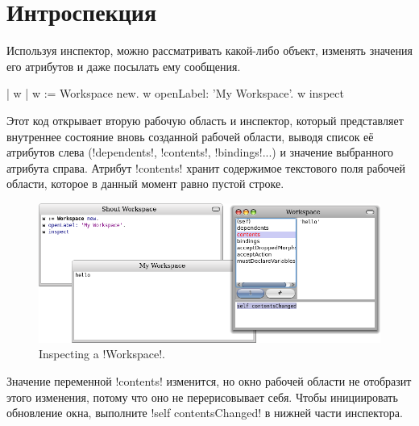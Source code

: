 \documentclass[a4paper,10pt,twoside]{book}
\begin{document}
\section{Интроспекция}

Используя инспектор, можно рассматривать какой-либо объект, изменять значения его атрибутов и даже посылать ему сообщения. 

\begin{code}{| w |}
w := Workspace new.
w openLabel: 'My Workspace'.
w inspect
\end{code}

Этот код открывает вторую рабочую область и инспектор,
который представляет внутреннее состояние вновь созданной рабочей области, выводя список её атрибутов слева (\ct!dependents!, \ct!contents!, \ct!bindings!...) и значение выбранного атрибута справа.
Атрибут \ct!contents! хранит содержимое текстового поля рабочей области, которое в данный момент равно пустой строке.

\begin{figure}[ht]\centering
	\includegraphics[width=\linewidth]{workspaceInspector}
	\caption{Inspecting a \ct!Workspace!.}
\end{figure}

Значение переменной \ct!contents! изменится, но окно рабочей области не отобразит этого изменения, потому что оно не перерисовывает себя.
Чтобы инициировать обновление окна, выполните \ct!self contentsChanged! в нижней части инспектора.
\end{document}
